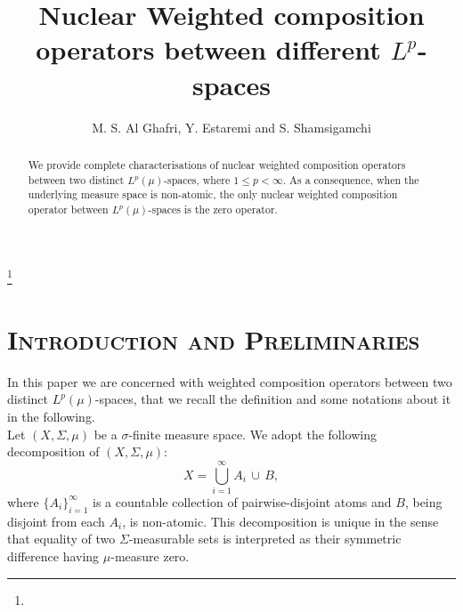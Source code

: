 \documentclass{amsart}
\theoremstyle{definition}\newtheorem{defn}[thm]{Definition}
\theoremstyle{remark}
\numberwithin{equation}{section}
\begin{document}
\title
{Nuclear Weighted composition operators between different $L^p$-spaces }

\author{\sc M. S. Al Ghafri, Y. Estaremi and S. Shamsigamchi }

\address{Department of Mathematics, University of Technology and Applied Sciences, Rustaq {329},  Oman,}
\address{Department of Mathematics and Computer Sciences,
Golestan University, Gorgan, Iran,}
\address{Department of Mathematics, Payame Noor(PNU) university, Tehran, Iran.}


\thanks{}




\date{}

\dedicatory{}

\commby{}

\begin{abstract}
We provide complete characterisations of nuclear weighted composition operators between
two distinct $L^p(\mu)$-spaces, where $1\leq p<\infty$. As a consequence, when the underlying measure space is
non-atomic, the only nuclear weighted composition operator between $L^p(\mu)$-spaces is the zero operator.

\end{abstract}

\maketitle


\section{\textsc{\bf Introduction and Preliminaries}}

In this paper we are concerned with weighted composition operators between two distinct $L^p(\mu)$-spaces, that we recall the definition and some notations about it in the following.\\

Let $(X,\Sigma,\mu)$ be a $\sigma$-finite measure space. We adopt the following decomposition of $(X,\Sigma,\mu)$:
\[
X = \bigcup_{i=1}^{\infty} A_i \,\cup\, B,
\]
where $\{A_i\}_{i=1}^{\infty}$ is a countable collection of pairwise-disjoint atoms and
$B$, being disjoint from each $A_i$, is non-atomic. This decomposition is unique in the
sense that equality of two $\Sigma$-measurable sets is interpreted as their symmetric
difference having $\mu$-measure zero.
\end{document}

